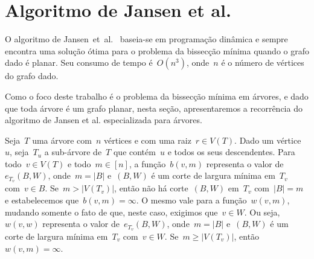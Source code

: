 \section {Algoritmo de Jansen et al.}

O algoritmo de Jansen~et~al.~\cite{JansenKLS01} baseia-se 
em programação dinâmica e sempre encontra
uma solução ótima para o problema da bissecção
mínima quando o grafo dado é planar.
Seu consumo de tempo é~$O(n^3)$, onde~$n$ é
o número de vértices do grafo dado.

Como o foco deste trabalho é o problema da 
bissecção mínima em árvores, e dado
que toda árvore é um grafo
planar, nesta seção, apresentaremos a 
recorrência do algoritmo de Jansen et al.
especializada para árvores. 

\bigskip
\bigskip


Seja~$T$ uma árvore com~$n$ vértices e com uma raiz~$r\in V(T)$.
Dado um vértice~$u$, seja~$T_u$ a sub-árvore de~$T$ que contém~$u$
e todos os seus descendentes. 
Para todo~${v\in V(T)}$ e todo~${m\in[n]}$,
a função~$b(v,m)$ representa o valor
de~$e_{T_v}(B,W)$, onde~${m=|B|}$
e~$(B,W)$ é um corte de largura mínima em~$T_v$ com~${v\in B}$.
Se~$m>|V(T_v)|$, então não há corte~$(B,W)$ em~$T_v$ com~$|B|=m$
e estabelecemos que~$b(v,m) = \infty$.
O mesmo vale para a função~$w(v,m)$, mudando somente
o fato de que, neste caso, exigimos que~${v\in W}$.
Ou seja,~$w(v,w)$ representa o valor
de~$e_{T_v}(B,W)$, onde~${m=|B|}$
e~$(B,W)$ é um corte de largura mínima em~$T_v$ com~${v\in W}$.
Se~$m\ge |V(T_v)|$, então~$w(v,m) = \infty$.

